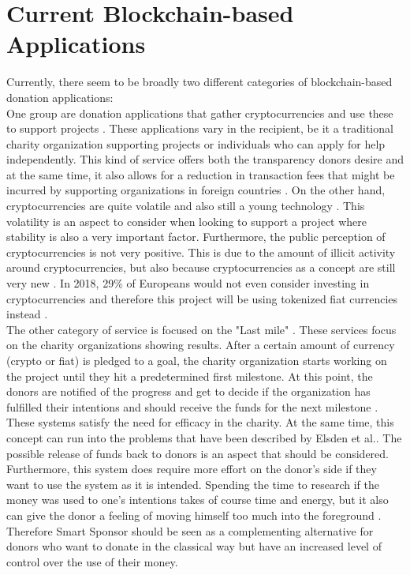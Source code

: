 \section*{Current Blockchain-based Applications}
Currently, there seem to be broadly two different categories of blockchain-based donation applications:\\
One group are donation applications that gather cryptocurrencies and use these to support projects \cite{bitgive}\cite{binance}\cite{giveBlock}\cite{engiven}. These applications vary in the recipient, be it a traditional charity organization supporting projects or individuals who can apply for help independently. This kind of service offers both the transparency donors desire and at the same time, it also allows for a reduction in transaction fees that might be incurred by supporting organizations in foreign countries \cite{engiven}. On the other hand, cryptocurrencies are quite volatile and also still a young technology \cite{willing}. This volatility is an aspect to consider when looking to support a project where stability is also a very important factor. Furthermore, the public perception of cryptocurrencies is not very positive. This is due to the amount of illicit activity around cryptocurrencies, but also because cryptocurrencies as a concept are still very new \cite{willing}. In 2018, 29\% of Europeans would not even consider investing in cryptocurrencies and therefore this project will be using tokenized fiat currencies instead \cite{willing}.\\
The other category of service is focused on the "Last mile" \cite{progDon}. These services focus on the charity organizations showing results. After a certain amount of currency (crypto or fiat) is pledged to a goal, the charity organization starts working on the project until they hit a predetermined first milestone. At this point, the donors are notified of the progress and get to decide if the organization has fulfilled their intentions and should receive the funds for the next milestone \cite{alice}\cite{promisegive}.\\
These systems satisfy the need for efficacy in the charity. At the same time, this concept can run into the problems that have been described by Elsden et al.\cite{progDon}. The possible release of funds back to donors is an aspect that should be considered. Furthermore, this system does require more effort on the donor's side if they want to use the system as it is intended. Spending the time to research if the money was used to one's intentions takes of course time and energy, but it also can give the donor a feeling of moving himself too much into the foreground \cite{progDon}. Therefore Smart Sponsor should be seen as a complementing alternative for donors who want to donate in the classical way but have an increased level of control over the use of their money.
